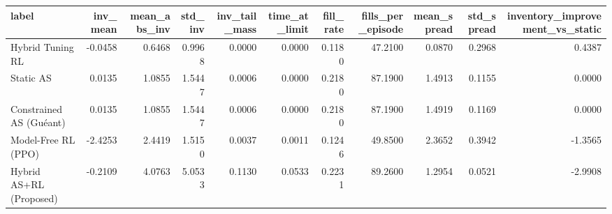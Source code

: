 \begin{tabular}{lrrrrrrrrrr}
\toprule
label & inv\_mean & mean\_abs\_inv & std\_inv & inv\_tail\_mass & time\_at\_limit & fill\_rate & fills\_per\_episode & mean\_spread & std\_spread & inventory\_improvement\_vs\_static \\
\midrule
Hybrid Tuning RL & -0.0458 & 0.6468 & 0.9968 & 0.0000 & 0.0000 & 0.1180 & 47.2100 & 0.0870 & 0.2968 & 0.4387 \\
Static AS & 0.0135 & 1.0855 & 1.5447 & 0.0006 & 0.0000 & 0.2180 & 87.1900 & 1.4913 & 0.1155 & 0.0000 \\
Constrained AS (Guéant) & 0.0135 & 1.0855 & 1.5447 & 0.0006 & 0.0000 & 0.2180 & 87.1900 & 1.4919 & 0.1169 & 0.0000 \\
Model-Free RL (PPO) & -2.4253 & 2.4419 & 1.5150 & 0.0037 & 0.0011 & 0.1246 & 49.8500 & 2.3652 & 0.3942 & -1.3565 \\
Hybrid AS+RL (Proposed) & -0.2109 & 4.0763 & 5.0533 & 0.1130 & 0.0533 & 0.2231 & 89.2600 & 1.2954 & 0.0521 & -2.9908 \\
\bottomrule
\end{tabular}
